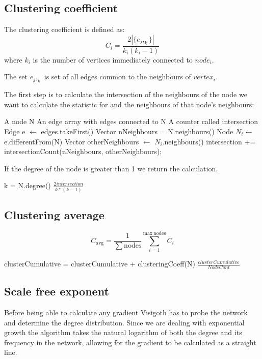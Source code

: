 \documentclass[a4paper,11pt,titlepage]{article}
\begin{document}
\subsection{Clustering coefficient}
The clustering coefficient is defined as:
\[
  C_i = \frac{2|\{e_j,_k\}|}{k_i(k_i-1)}
\]
where $k_i$ is the number of vertices immediately connected to $node_i$.

The set ${e_j,_k}$ is set of all edges common to the neighbours of $vertex_i$.

The first step is to calculate the intersection of the neighbours
of the node we want to calculate the statistic for and the
neighbours of that node's neighbours:

\begin{algorithmic}
  \REQUIRE A node N
  \REQUIRE An edge array with edges connected to N
  \REQUIRE A counter called intersection
    \STATE Edge e $\gets$ edges.takeFirst()
    \STATE Vector nNeighbours = N.neighbours()
    \STATE Node $N_i \gets$ e.differentFrom(N)
    \STATE Vector otherNeighbours $\gets$  $N_i$.neighbours()
    \STATE  intersection += intersectionCount(nNeighbours, otherNeighbours);
  \ENDWHILE
\end{algorithmic}

If the degree of the node is greater than 1 we return the calculation.

\begin{algorithmic}
  \REQUIRE k = N.degree()
    \RETURN $\frac{2intersection}{k*(k-1)}$
  \ELSE
  \ENDIF
\end{algorithmic}


\subsection{Clustering average}
\[
  C_\mathrm{avg} =
  \frac{1}{\mathrm{\sum nodes}}\sum_{i=1}^{\mathrm{max\ nodes}} C_i
\]

\begin{algorithmic}
    \STATE clusterCumulative = clusterCumulative + clusteringCoeff(N)
  \ENDFOR
  \RETURN $\frac{clusterCumulative}{Node Cont}$
\end{algorithmic}


\subsection{Scale free exponent}
Before being able to calculate any gradient Visigoth has to probe the network
and determine the degree distribution. Since we are dealing with exponential
growth the algorithm takes the natural logarithm of both the degree and its
frequency in the network, allowing for the gradient to be calculated as a
straight line.
\end{document}
